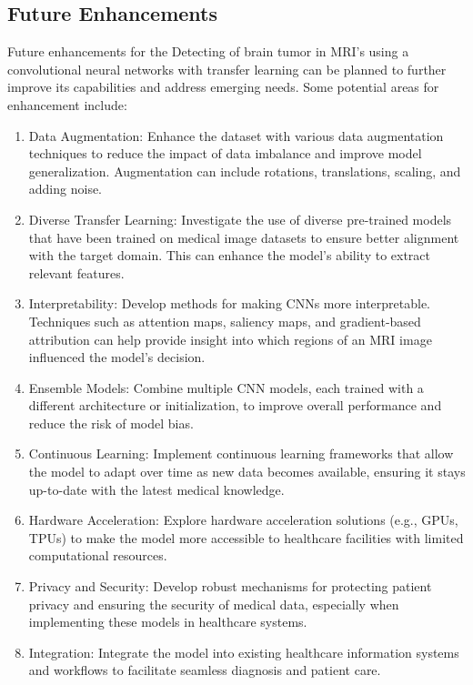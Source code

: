 \newpage
\subsection{Future Enhancements}

Future enhancements for the Detecting of brain tumor in MRI’s using a convolutional neural networks with transfer learning can be planned to further improve its capabilities and address emerging needs. Some potential areas for enhancement include:

\begin{enumerate}
  \setlength\itemsep{1.5em}
    \item Data Augmentation: Enhance the dataset with various data augmentation techniques to reduce the impact of data imbalance and improve model generalization. Augmentation can include rotations, translations, scaling, and adding noise.

	\item Diverse Transfer Learning: Investigate the use of diverse pre-trained models that have been trained on medical image datasets to ensure better alignment with the target domain. This can enhance the model's ability to extract relevant features.
	
	\item  Interpretability: Develop methods for making CNNs more interpretable. Techniques such as attention maps, saliency maps, and gradient-based attribution can help provide insight into which regions of an MRI image influenced the model's decision.
	
	
	\item Ensemble Models: Combine multiple CNN models, each trained with a different architecture or initialization, to improve overall performance and reduce the risk of model bias.
	
	\item Continuous Learning: Implement continuous learning frameworks that allow the model to adapt over time as new data becomes available, ensuring it stays up-to-date with the latest medical knowledge.
	

	\item  Hardware Acceleration: Explore hardware acceleration solutions (e.g., GPUs, TPUs) to make the model more accessible to healthcare facilities with limited computational resources.
	
		\item  Privacy and Security: Develop robust mechanisms for protecting patient privacy and ensuring the security of medical data, especially when implementing these models in healthcare systems.
  \item Integration: Integrate the model into existing healthcare information systems and workflows to facilitate seamless diagnosis and patient care.
	          
\end{enumerate}